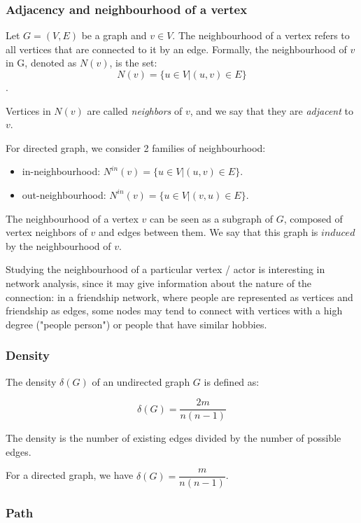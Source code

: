 \documentclass[table]{report}
\begin{document}
\subsubsection{Adjacency and neighbourhood of a vertex}

Let $G =(V,E)$ be a graph and $v \in V$. The neighbourhood of a vertex refers to all vertices that are connected to it by an edge. Formally, the neighbourhood of $v$ in G, denoted as $N(v)$, is the set: 
$$N(v) = \{u \in V | (u,v) \in E\}$$. 

Vertices in $N(v)$ are called \textit{neighbors} of $v$, and we say that they are \textit{adjacent} to $v$.


For directed graph, we consider 2 families of neighbourhood: 
\begin{itemize}[noitemsep]
    \item in-neighbourhood: $N^{in}(v) = \{u \in V | (u,v) \in E\}$. 

    \item out-neighbourhood: $N^{in}(v) = \{u \in V | (v,u) \in E\}$. 
\end{itemize}

The neighbourhood of a vertex $v$ can be seen as a subgraph of $G$, composed of vertex neighbors of $v$ and edges between them. We say that this graph is $induced$ by the neighbourhood of $v$. 


Studying the neighbourhood of a particular vertex / actor is interesting in network analysis, since it may give information about the nature of the connection: in a friendship network, where people are represented as vertices and friendship as edges, some nodes may tend to connect with vertices with a high degree ("people person") or people that have similar hobbies.


\subsubsection{Density}

The density $\delta(G)$ of an undirected graph $G$ is defined as:

$$\delta(G) = \dfrac{2m}{n(n-1)}$$ 

The density is the number of existing edges divided by the number of possible edges.

For a directed graph, we have $\delta(G) = \dfrac{m}{n(n-1)}$.

\subsubsection{Path}
\end{document}
